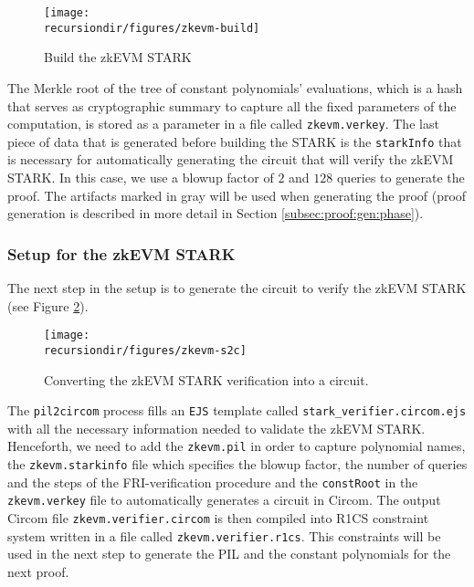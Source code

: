 
\begin{figure}[H]
\centering
\texttt{[image: \\recursiondir/figures/zkevm-build]}
\caption{Build the zkEVM STARK}
\label{fig:zkevm:build}
\end{figure}

The Merkle root of the tree of constant polynomials' evaluations, which is a hash that serves as cryptographic summary to capture all the fixed parameters of the computation, is stored as a parameter in a file called \texttt{zkevm.verkey}.
The last piece of data that is generated before building the STARK is the \texttt{starkInfo} that is necessary for automatically generating the circuit that will verify the zkEVM STARK. 
In this case, we use a blowup factor of $2$ and $128$ queries to generate the proof. 
The artifacts marked in gray will be used when generating the proof (proof generation is described in more detail in Section \ref{subsec:proof:gen:phase}). 





\subsubsection{Setup \stoc for the zkEVM STARK}

The next step in the setup is to generate the circuit to verify the zkEVM STARK (see Figure \ref{fig:zkevm:s2c}). 

\begin{figure}[H]
\centering
\texttt{[image: \\recursiondir/figures/zkevm-s2c]}
\caption{Converting the zkEVM STARK verification into a circuit.}
\label{fig:zkevm:s2c}
\end{figure}


The \texttt{pil2circom} process fills an \texttt{EJS} template called \texttt{stark\_verifier.circom.ejs} with all the necessary information needed to validate the zkEVM STARK. Henceforth, we need to add the \texttt{zkevm.pil} in order to capture polynomial names, the \texttt{zkevm.starkinfo} file which specifies the blowup factor, the number of queries and the steps of the FRI-verification procedure and the \texttt{constRoot} in the \texttt{zkevm.verkey} file to automatically generates a circuit in Circom. The output Circom file \texttt{zkevm.verifier.circom} is then compiled into R1CS constraint system written in a file called \texttt{zkevm.verifier.r1cs}. This constraints will be used in the next step to generate the PIL and the constant polynomials for the next proof. 

